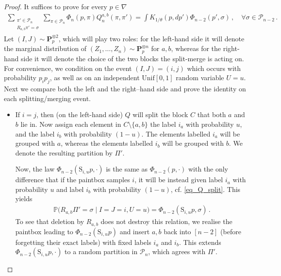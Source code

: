 \documentclass[a4paper,11pt]{article}
\newcommand{\mP}{\mathcal{P}}
\numberwithin{equation}{section}
\begin{document}
\begin{proof}
It suffices to prove for every $ p \in \nabla$
\begin{equation*}
\begin{aligned}
	\sum_{\substack{\pi ' \in \mP_{n}\\R_{a,b} \pi'= \sigma}}
	\sum_{\pi \in \mP_{n}}
 \Phi_{n}(p, \pi) Q_{n}^{a,b} ( \pi ,\pi'  ) = \int K_{1/\theta}(p,dp')\Phi_{n-2}(p',\sigma)\,, \quad \forall \sigma \in \mP_{n-2}\,.
\end{aligned}
\end{equation*}
Let $ (I,J) \sim \mathbf{P}^{\otimes 2}_{p}$, which will play two roles: for the left-hand side it will denote the marginal distribution of $ (Z_{1}, \ldots, Z_{n})\sim\mathbf{P}^{\otimes n}_{p}$ for $a,b$, whereas for the right-hand side it will denote the choice of the two blocks the split-merge is acting on.
For convenience, we condition on the event $ (I,J)=(i,j)$ which occurs with probability $p_{i} p_{j}$, as well as on an independent $ \mathrm{Unif}[0,1]$ random variable $U=u$.
Next we compare both the left and the right--hand side and prove the identity on each splitting/merging event.
\begin{itemize}
\item
If $i= j$, then (on the left-hand side) $ Q$ will split the block $C$ that both $a$ and $b$ lie in.
Now assign each  element in $ C \setminus \{a,b\}$ the label $ i_{a}$ with probability $ u$, and the label $ i_{b} $ with probability $(1-u)$. The elements labelled $i_{a}$ will be grouped with $a$, whereas the elements labelled $ i_{b}$ will be grouped with $b$. We denote the resulting partition by $ \Pi' $.


Now, the law $ \Phi_{n-2}(\mathrm S_{i,u}p,\cdot)$ is the same as  $ \Phi_{n-2}(p,\cdot)$ with the only difference that if the paintbox samples $i$, it will be instead given label $ i_{a}$ with probability $u$ and label $ i_{b}$ with probability $ (1-u)$, cf. \eqref{eq_Q_split}.
This yields
\begin{equation*}
\begin{aligned}
\mathbb P\bigl(R_{a,b}\Pi'=\sigma \mid I=J=i,U=u\bigr)
=
\Phi_{n-2}(\mathrm S_{i,u}p,\sigma)\,.
\end{aligned}
\end{equation*}
To see that  deletion by $ R_{a,b}$ does not destroy this relation, we realise the paintbox leading to $ \Phi_{n-2}(\mathrm{S}_{i,u}p)$ and 
 insert $a,b $ back into $[n-2]$ (before forgetting their exact labels) with fixed labels $ i_{a}$ and $ i_{b}$. This extends $ \Phi_{n-2}(\mathrm S_{i,u}p,\cdot)$ to a random partition in $ \mP_{n}$, which agrees with $ \Pi' $.	




\end{itemize}
\end{proof}
\end{document}
